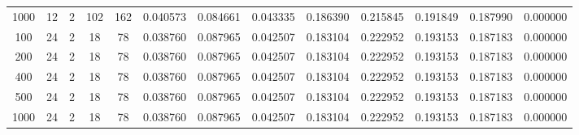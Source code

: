 \begin{table}[h]
\begin{tabular}{ccccccccccccc}
1000 & 12 & 2 & 102 & 162 & 0.040573 & 0.084661 & 0.043335 & 0.186390 & 0.215845 & 0.191849 & 0.187990 & 0.000000 \\
100 & 24 & 2 & 18 & 78 & 0.038760 & 0.087965 & 0.042507 & 0.183104 & 0.222952 & 0.193153 & 0.187183 & 0.000000 \\
200 & 24 & 2 & 18 & 78 & 0.038760 & 0.087965 & 0.042507 & 0.183104 & 0.222952 & 0.193153 & 0.187183 & 0.000000 \\
400 & 24 & 2 & 18 & 78 & 0.038760 & 0.087965 & 0.042507 & 0.183104 & 0.222952 & 0.193153 & 0.187183 & 0.000000 \\
500 & 24 & 2 & 18 & 78 & 0.038760 & 0.087965 & 0.042507 & 0.183104 & 0.222952 & 0.193153 & 0.187183 & 0.000000 \\
1000 & 24 & 2 & 18 & 78 & 0.038760 & 0.087965 & 0.042507 & 0.183104 & 0.222952 & 0.193153 & 0.187183 & 0.000000 \\
\bottomrule
\end{tabular}
\end{table}
